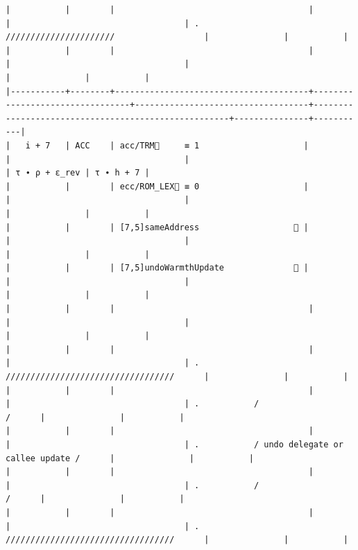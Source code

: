 \documentclass[varwidth=\maxdimen,margin=0.5cm,multi={verbatim}]{standalone}
\begin{document}
\begin{verbatim}
|           |        |                                       |                                 |                                   | .           //////////////////////                  |               |           |
|           |        |                                       |                                 |                                   |                                                     |               |           |
|-----------+--------+---------------------------------------+---------------------------------+-----------------------------------+-----------------------------------------------------+---------------+-----------|
|   i + 7   | ACC    | acc/TRM🚩     ≡ 1                     |                                 |                                   |                                                     | τ ∙ ρ + ε_rev | τ ∙ h + 7 |
|           |        | ecc/ROM_LEX🚩 ≡ 0                     |                                 |                                   |                                                     |               |           |
|           |        | [7,5]sameAddress                   👋 |                                 |                                   |                                                     |               |           |
|           |        | [7,5]undoWarmthUpdate              👋 |                                 |                                   |                                                     |               |           |
|           |        |                                       |                                 |                                   |                                                     |               |           |
|           |        |                                       |                                 |                                   | .           //////////////////////////////////      |               |           |
|           |        |                                       |                                 |                                   | .           /                                /      |               |           |
|           |        |                                       |                                 |                                   | .           / undo delegate or callee update /      |               |           |
|           |        |                                       |                                 |                                   | .           /                                /      |               |           |
|           |        |                                       |                                 |                                   | .           //////////////////////////////////      |               |           |

\end{verbatim}
\end{document}
